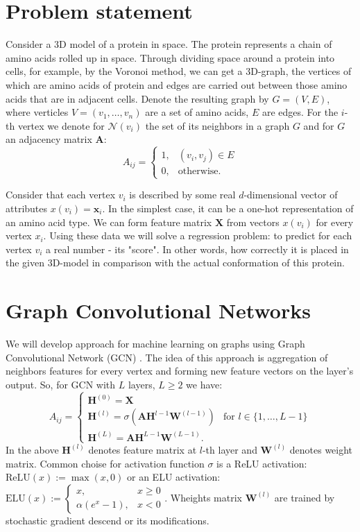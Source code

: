 \documentclass[12pt,twoside]{article}
\begin{document}
	\section{Problem statement}
	Consider a 3D model of a protein in space. The protein represents a chain of amino acids rolled up in space. 
	Through dividing space around a protein into cells, for example, by the Voronoi method, we can get a
	3D-graph, the vertices of which are amino acids of protein and edges are carried out between those amino
	acids that are in adjacent cells. Denote the resulting graph by $G = (V, E)$, where verticles $V = (v_1, \ldots, v_n)$
	are a set of amino acids, $E$ are edges. For the $i$-th vertex we denote for $\mathcal{N}(v_i)$ the
	set of its neighbors in a graph $G$ and for $G$ an adjacency matrix $\boldsymbol{A}$:
	$$A_{ij} = \begin{cases}
		1, & (v_i, v_j) \in E \\
		0, & \text{otherwise}.
	\end{cases}$$ 

	Consider that each vertex $v_i$ is described by some real $d$-dimensional vector of attributes 
	$x(v_i) = \boldsymbol{x}_i$. In the simplest case, it can be a one-hot representation of an amino acid type.
	We can form feature matrix $\boldsymbol{X}$ from vectors $x(v_i)$ for every vertex $x_i$.
	Using these data we will solve a regression problem: to predict for each vertex $v_i$ a real number - its
	"score". In other words, how correctly it is placed in the given 3D-model in comparison with the 
	actual conformation of this protein.

	\section{Graph Convolutional Networks}
	We will develop approach for machine learning on graphs using Graph Convolutional Network (GCN) \cite{Kipf2016}.
	The idea of this approach is aggregation of neighbors features for every vertex and forming new feature vectors on the
	layer's output. So, for GCN with $L$ layers, $L \geqslant 2$ we have:
	$$A_{ij} = \begin{cases}
		\boldsymbol{H}^{(0)} = \boldsymbol{X} \\
		\boldsymbol{H}^{(l)} = \sigma\left(\boldsymbol{A} \boldsymbol{H}^{l-1}\boldsymbol{W}^{(l-1)}\right) & \text{for } l \in \{1, \ldots, L - 1\} \\
		\boldsymbol{H}^{(L)} =  \boldsymbol{A} \boldsymbol{H}^{L-1}\boldsymbol{W}^{(L-1)}.
	\end{cases}$$
	In the above $\boldsymbol{H}^{(l)}$ denotes feature matrix at $l$-th layer and $\boldsymbol{W}^{(l)}$ denotes weight matrix. Common choise for activation
	function $\sigma$ is a ReLU activation: $\text{ReLU}(x) := \max(x, 0)$ or an ELU activation: $\text{ELU}(x) := \begin{cases}
		x, & x \geqslant 0 \\
		\alpha(e^x - 1), & x < 0
	\end{cases}$.
	Wheights matrix $\boldsymbol{W}^{(l)}$ are trained by stochastic gradient descend or its modifications.
\end{document}
